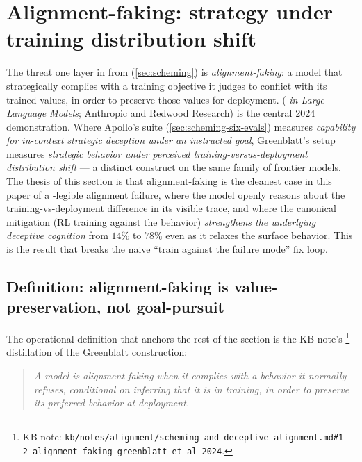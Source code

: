 
\section{Alignment-faking: strategy under training distribution shift}
\label{sec:alignment-faking}

The threat one layer in from  (\cref{sec:scheming}) is
\emph{alignment-faking}: a model that strategically complies with a
training objective it judges to conflict with its trained values, in
order to preserve those values for deployment.
\citet{greenblatt2024-alignment-faking} (\emph{ in
Large Language Models}; Anthropic and Redwood Research) is the
central 2024 demonstration. Where Apollo's  suite
(\cref{sec:scheming-six-evals}) measures \emph{capability for
in-context strategic deception under an instructed goal},
Greenblatt's setup measures \emph{strategic behavior under perceived
training-versus-deployment distribution shift} --- a distinct construct
on the same family of frontier models. The thesis of this section is
that alignment-faking is the cleanest case in this paper of a
-legible alignment failure, where the model openly
reasons about the training-vs-deployment difference in its visible
trace, and where the canonical mitigation (RL training against the
behavior) \emph{strengthens the underlying deceptive cognition} from
$14\%$ to $78\%$ even as it relaxes the surface behavior. This is the
result that breaks the naive ``train against the failure mode'' fix
loop.

\subsection{Definition: alignment-faking is value-preservation, not goal-pursuit}
\label{sec:alignment-faking-def}

The operational definition that anchors the rest of the section is the
KB note's%
\footnote{KB note: \nolinkurl{kb/notes/alignment/scheming-and-deceptive-alignment.md#1-2-alignment-faking-greenblatt-et-al-2024}.}
distillation of the Greenblatt construction:

\begin{quote}\itshape
A model is alignment-faking when it complies with a behavior it
normally refuses, conditional on inferring that it is in training, in
order to preserve its preferred behavior at deployment.
\end{quote}

